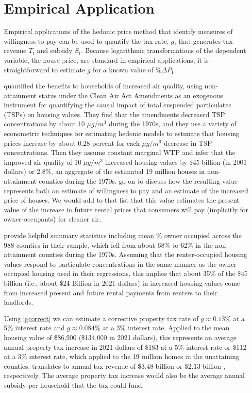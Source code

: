 \documentclass[ecta,nameyear,draft]{econsocart}
\theoremstyle{plain}
\theoremstyle{remark}
\begin{document}
 
\section{Empirical Application}
Empirical applications of the hedonic price method that identify measures of willingness to pay can be used to quantify the tax rate, $g$, that generates tax revenue $T_t$ and subsidy $S_t$. Because logarithmic transformations of the dependent variable, the house price, are standard in empirical applications, it is straightforward to estimate $g$ for a known value of $\%\Delta P_1 $. 

\cite{chaygreenstone05} quantified the benefits to households of increased air quality, using non-attainment status under the Clean Air Act Amendments as an exogenous instrument for quantifying the causal impact of total suspended particulates (TSPs) on housing values. They find that the amendments decreased TSP concentrations by about 10 $\mu g/m^3$ during the 1970s, and they use a variety of econometric techniques for estimating hedonic models to estimate that housing prices increase by about 0.28 percent for each $\mu g/m^3$ decrease in TSP concentrations. Then they assume constant marginal WTP and infer that the improved air quality of 10 $\mu g/m^3$ increased housing values by \$45 billion (in 2001 dollars) or 2.8\%, an aggregate of the estimated 19 million houses in non-attainment counties during the 1970s. \cite{chaygreenstone05} go on to discuss how the resulting value represents both an estimate of willingness to pay and an estimate of the increased price of houses. We would add to that list that this value estimates the present value of the increase in future rental prices that consumers will pay (implicitly for owner-occupants) for cleaner air.

\cite{chaygreenstone05} provide helpful summary statistics including mean \% owner occupied across the 988 counties in their sample, which fell from about 68\% to 62\% in the non-attainment counties during the 1970s. Assuming that the renter-occupied housing values respond to particulate concentrations in the same manner as the owner-occupied housing used in their regressions, this implies that about 35\% of the \$45 billion (i.e., about \$24 Billion in 2021 dollars) in increased housing values come from increased present and future rental payments from renters to their landlords. 

Using \ref{gcorrect} we can estimate a corrective property tax rate of $g\approx 0.13\%$ at a 5\% interest rate and $g\approx 0.084\%$ at a 3\% interest rate. Applied to the mean housing value of \$86,900 (\$134,000 in 2021 dollars), this represents an average annual property tax increase in 2021 dollars of \$183 at a 5\% interest rate or \$112 at a 3\% interest rate, which applied to the 19 million homes in the unattaining counties, translates to annual tax revenue of \$3.48 billion %
or \$2.13 billion 
, respectively. The average property tax increase would also be the average annual subsidy per household that the tax could fund. 
\end{document}
